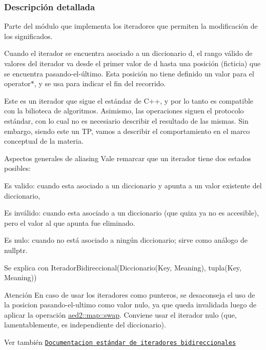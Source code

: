 \subsubsection{Descripción detallada}
Parte del módulo que implementa los iteradores que permiten la modificación de los significados. 

Cuando el iterador se encuentra asociado a un diccionario {\ttfamily d}, el rango válido de valores del iterador va desde el primer valor de {\ttfamily d} hasta una posición (ficticia) que se encuentra pasando-\/el-\/último. Esta posición no tiene definido un valor para el {\ttfamily operator$\ast$}, y se usa para indicar el fin del recorrido.

Este es un iterador que sigue el estándar de C++, y por lo tanto es compatible con la bilioteca de algoritmos. Asimismo, las operaciones siguen el protocolo estándar, con lo cual no es necesiario describir el resultado de las mismas. Sin embargo, siendo este un TP, vamos a describir el comportamiento en el marco conceptual de la materia.

\begin{DoxyParagraph}{Aspectos generales de aliasing}
Vale remarcar que un iterador tiene dos estados posibles\+:
\begin{DoxyEnumerate}
\item Es valido\+: cuando esta asociado a un diccionario y apunta a un valor existente del diccionario,
\item Es inválido\+: cuando esta asociado a un diccionario (que quiza ya no es accesible), pero el valor al que apunta fue eliminado.
\item Es nulo\+: cuando no está asociado a ningún diccionario; sirve como análogo de {\ttfamily nullptr}. 
\end{DoxyEnumerate}
\end{DoxyParagraph}


\begin{DoxyParagraph}{Se explica con}
Iterador\+Bidireccional(Diccionario(Key, Meaning), tupla(Key, Meaning))
\end{DoxyParagraph}
\begin{DoxyAttention}{Atención}
En caso de usar los iteradores como punteros, se desaconseja el uso de la posicion pasando-\/el-\/ultimo como valor nulo, ya que queda invalidada luego de aplicar la operación \hyperlink{classaed2_1_1map_a43ddb71cc91e5c6021a7a1f243d6cc4a_a43ddb71cc91e5c6021a7a1f243d6cc4a}{aed2\+::map\+::swap}. Conviene usar el iterador nulo (que, lamentablemente, es independiente del diccionario).
\end{DoxyAttention}
\begin{DoxySeeAlso}{Ver también}
\href{http://en.cppreference.com/w/cpp/concept/BidirectionalIterator}{\tt Documentacion estándar de iteradores bidireccionales} 
\end{DoxySeeAlso}


